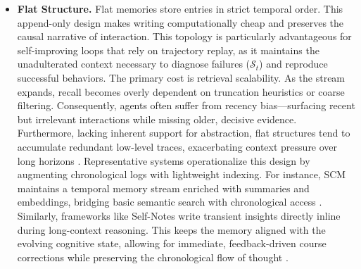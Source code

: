 \begin{itemize}[leftmargin=*]
    \item \textbf{Flat Structure.}     Flat memories store entries in strict temporal order. This append-only design makes writing computationally cheap and  preserves the causal narrative of interaction. This topology is particularly advantageous for self-improving loops that rely on trajectory replay, as it maintains the unadulterated context necessary to diagnose failures ($\mathcal{S}_t$) and reproduce successful behaviors. The primary cost is retrieval scalability. As the stream expands, recall becomes overly dependent on truncation heuristics or coarse filtering. Consequently, agents often suffer from recency bias—surfacing recent but irrelevant interactions while missing older, decisive evidence. Furthermore, lacking inherent support for abstraction, flat structures tend to accumulate redundant low-level traces, exacerbating context pressure over long horizons \citep{antony2024causal, sun2025hierarchicalmemoryhighefficiencylongterm}. Representative systems operationalize this design by augmenting chronological logs with lightweight indexing. For instance, SCM maintains a temporal memory stream enriched with summaries and embeddings, bridging basic semantic search with chronological access \citep{wang2025scmenhancinglargelanguage}. Similarly, frameworks like Self-Notes write transient insights directly inline during long-context reasoning. This keeps the memory  aligned with the evolving cognitive state, allowing for immediate, feedback-driven course corrections while preserving the chronological flow of thought \citep{lanchantin2023learningreasonmemorizeselfnotes}.


\end{itemize}
